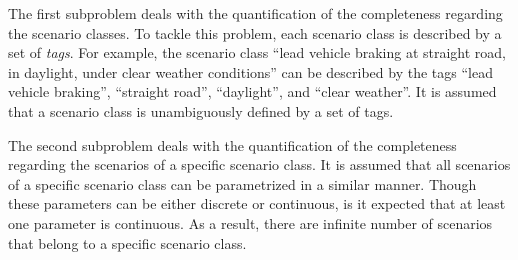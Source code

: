 \documentclass[10pt,final,a4paper,oneside,onecolumn]{article}
\theoremstyle{plain}\newtheorem{definition}{Definition}[section]    %
\theoremstyle{definition}\newtheorem{example}{Example}[section]     %
\theoremstyle{remark}\newtheorem{remarkenv}{Remark}[section]        %
\begin{document}
The first subproblem deals with the quantification of the completeness regarding the scenario classes. To tackle this problem, each scenario class is described by a set of \emph{tags}. For example, the scenario class ``lead vehicle braking at straight road, in daylight, under clear weather conditions'' can be described by the tags ``lead vehicle braking'', ``straight road'', ``daylight'', and ``clear weather''. It is assumed that a scenario class is unambiguously defined by a set of tags.

The second subproblem deals with the quantification of the completeness regarding the scenarios of a specific scenario class. It is assumed that all scenarios of a specific scenario class can be parametrized in a similar manner. Though these parameters can be either discrete or continuous, is it expected that at least one parameter is continuous. As a result, there are infinite number of scenarios that belong to a specific scenario class.  
\cbend


%		
\end{document}
